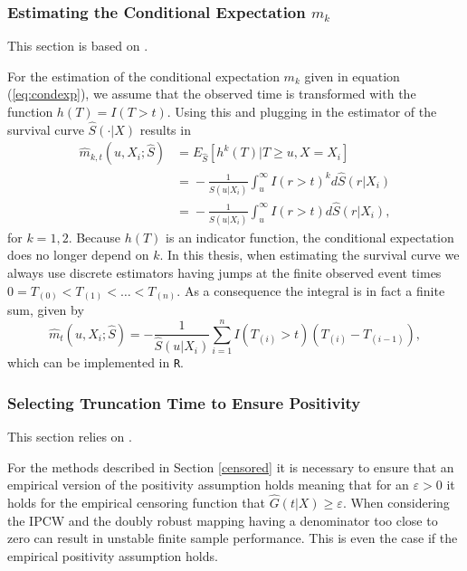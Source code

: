\documentclass[12pt, a4paper]{scrartcl}
\theoremstyle{definition}
\theoremstyle{plain}
\numberwithin{equation}{section}
\numberwithin{figure}{section}
\numberwithin{table}{section}
\begin{document}
	\subsubsection{Estimating the Conditional Expectation $m_k$}
	
	This section is based on \citet*{drtrees}.
	
	For the estimation of the conditional expectation $m_k$ given in equation (\ref{eq:condexp}), we assume that the observed time is transformed with the function $h(T) = I(T>t)$.
	Using this and plugging in the estimator of the survival curve $\hat{S}(\cdot\vert X)$ results in
	\begin{equation*}
	\begin{split}
	\hat{m}_{k,t} (u, X_i; \hat{S}) &={} E_{\hat{S}}[h^k(T)\vert T \geq u, X=X_i]\\
	&={}-\frac{1}{\hat{S}(u\vert X_i)}\int_u^{\infty}I(r> t)^kd\hat{S}(r\vert X_i)\\
	&={}-\frac{1}{\hat{S}(u\vert X_i)}\int_u^{\infty}I(r> t)d\hat{S}(r\vert X_i),
	\end{split}
	\end{equation*}
	for $k=1,2$.
	Because $h(T)$ is an indicator function, the conditional expectation does no longer depend on $k$.
	In this thesis, when estimating the survival curve we always use discrete estimators having jumps at the finite observed event times $0=T_{(0)}<T_{(1)}<\dots<T_{(n)}$.
	As a consequence the integral is in fact a finite sum, given by
	\begin{equation*}
	\hat{m}_t (u, X_i; \hat{S}) = -\frac{1}{\hat{S}(u\vert X_i)}\sum_{i=1}^n I(T_{(i)}>t)(T_{(i)}-T_{(i-1)}),
	\end{equation*}
	which can be implemented in \texttt{R}.
	
	\subsubsection{Selecting Truncation Time to Ensure Positivity}
	
	This section relies on \citet*{drtrees}.
	
	For the methods described in Section \ref{censored} it is necessary to ensure that an empirical version of the positivity assumption holds meaning that for an $\varepsilon>0$ it holds for the empirical censoring function that $\hat{G}(t\vert X) \geq \varepsilon$.
	When considering the IPCW and the doubly robust mapping having a denominator too close to zero can result in unstable finite sample performance.
	This is even the case if the empirical positivity assumption holds.
	
\end{document}
